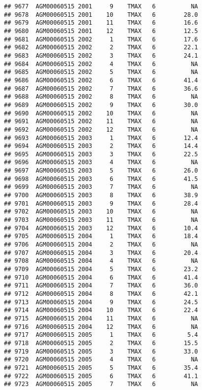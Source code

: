 \documentclass{article}\usepackage[]{graphicx}\usepackage[]{color}
\makeatletter
\newenvironment{kframe}{%
 \def\at@end@of@kframe{}%
 \ifinner\ifhmode%
  \def\at@end@of@kframe{\end{minipage}}%
  \begin{minipage}{\columnwidth}%
 \fi\fi%
 \def\FrameCommand##1{\hskip\@totalleftmargin \hskip-\fboxsep
 \colorbox{shadecolor}{##1}\hskip-\fboxsep
     \hskip-\linewidth \hskip-\@totalleftmargin \hskip\columnwidth}%
 \MakeFramed {\advance\hsize-\width
   \@totalleftmargin\z@ \linewidth\hsize
   \@setminipage}}%
 {\par\unskip\endMakeFramed%
 \at@end@of@kframe}
\newenvironment{knitrout}{}{} %
\makeatother
\begin{document}
\begin{knitrout}
\begin{kframe}
\begin{verbatim}
## 9677  AGM00060515 2001     9    TMAX   6          NA
## 9678  AGM00060515 2001    10    TMAX   6        28.0
## 9679  AGM00060515 2001    11    TMAX   6        16.6
## 9680  AGM00060515 2001    12    TMAX   6        12.5
## 9681  AGM00060515 2002     1    TMAX   6        17.6
## 9682  AGM00060515 2002     2    TMAX   6        22.1
## 9683  AGM00060515 2002     3    TMAX   6        24.1
## 9684  AGM00060515 2002     4    TMAX   6          NA
## 9685  AGM00060515 2002     5    TMAX   6          NA
## 9686  AGM00060515 2002     6    TMAX   6        41.4
## 9687  AGM00060515 2002     7    TMAX   6        36.6
## 9688  AGM00060515 2002     8    TMAX   6          NA
## 9689  AGM00060515 2002     9    TMAX   6        30.0
## 9690  AGM00060515 2002    10    TMAX   6          NA
## 9691  AGM00060515 2002    11    TMAX   6          NA
## 9692  AGM00060515 2002    12    TMAX   6          NA
## 9693  AGM00060515 2003     1    TMAX   6        12.4
## 9694  AGM00060515 2003     2    TMAX   6        14.4
## 9695  AGM00060515 2003     3    TMAX   6        22.5
## 9696  AGM00060515 2003     4    TMAX   6          NA
## 9697  AGM00060515 2003     5    TMAX   6        26.0
## 9698  AGM00060515 2003     6    TMAX   6        41.5
## 9699  AGM00060515 2003     7    TMAX   6          NA
## 9700  AGM00060515 2003     8    TMAX   6        38.9
## 9701  AGM00060515 2003     9    TMAX   6        28.4
## 9702  AGM00060515 2003    10    TMAX   6          NA
## 9703  AGM00060515 2003    11    TMAX   6          NA
## 9704  AGM00060515 2003    12    TMAX   6        10.4
## 9705  AGM00060515 2004     1    TMAX   6        18.4
## 9706  AGM00060515 2004     2    TMAX   6          NA
## 9707  AGM00060515 2004     3    TMAX   6        20.4
## 9708  AGM00060515 2004     4    TMAX   6          NA
## 9709  AGM00060515 2004     5    TMAX   6        23.2
## 9710  AGM00060515 2004     6    TMAX   6        41.4
## 9711  AGM00060515 2004     7    TMAX   6        36.0
## 9712  AGM00060515 2004     8    TMAX   6        42.1
## 9713  AGM00060515 2004     9    TMAX   6        24.5
## 9714  AGM00060515 2004    10    TMAX   6        22.4
## 9715  AGM00060515 2004    11    TMAX   6          NA
## 9716  AGM00060515 2004    12    TMAX   6          NA
## 9717  AGM00060515 2005     1    TMAX   6         5.4
## 9718  AGM00060515 2005     2    TMAX   6        15.5
## 9719  AGM00060515 2005     3    TMAX   6        33.0
## 9720  AGM00060515 2005     4    TMAX   6          NA
## 9721  AGM00060515 2005     5    TMAX   6        35.4
## 9722  AGM00060515 2005     6    TMAX   6        41.1
## 9723  AGM00060515 2005     7    TMAX   6          NA

\end{verbatim}
\end{kframe}
\end{knitrout}
\end{document}
